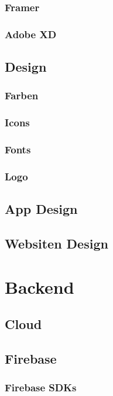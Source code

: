 \subsubsection{Framer}
\subsubsection{Adobe XD}


\subsection{Design}
\subsubsection{Farben}
\subsubsection{Icons}
\subsubsection{Fonts}
\subsubsection{Logo}
\subsection{App Design}
\subsection{Websiten Design}

\section{Backend}
\subsection{Cloud}
\author{Martin Hausleitner}

\subsection{Firebase}
\author{Martin Hausleitner}

\subsubsection{Firebase SDKs}

